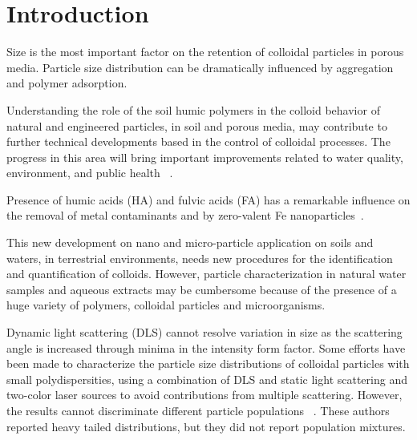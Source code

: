 \documentclass[journal=langd5,manuscript=article]{achemso}
\begin{document}
\section{Introduction}








Size is the most important factor on the retention of colloidal particles in porous media. Particle size distribution can be dramatically influenced by aggregation and polymer adsorption.  





Understanding  the role of the soil humic polymers in the colloid behavior of natural and engineered particles, in soil and porous media, may contribute to further technical developments based in the control of colloidal processes. The progress in this area will bring important improvements related to water quality, environment, and public health~\cite{Ngo2008}\cite{Farre2011} .
%
%

Presence of humic acids (HA) and fulvic acids (FA) has a remarkable influence on the removal of metal contaminants 
  and   by zero-valent Fe nanoparticles~\cite{Mak2011234}.

This new development on nano and micro-particle application on soils and waters, in terrestrial environments, needs new procedures for the identification and quantification of colloids. However, particle characterization in natural water samples and aqueous extracts may be cumbersome because of the presence of a huge variety of polymers, colloidal particles and microorganisms.



Dynamic light scattering (DLS)  cannot resolve variation in size as the scattering angle is increased through minima in the intensity form factor. Some efforts have been made to characterize the particle size distributions of colloidal particles with small polydispersities, using a combination of DLS and static light scattering and two-color laser sources to avoid contributions from multiple scattering. However, the results cannot discriminate different particle populations~\cite{Bryant2003AccurateSuspensions} . These authors reported heavy tailed distributions, but they did not report population mixtures.
\end{document}
